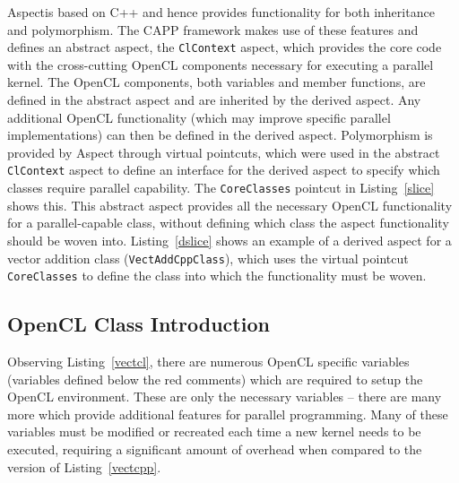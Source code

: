 \documentclass{sig-alternate-05-2015}
\begin{document}
Aspect\CPP is based on C++ and hence provides functionality for both inheritance
and polymorphism. The  CAPP framework makes use of these features and defines
an abstract aspect, the \lstinline$ClContext$ aspect, which provides the core \CPP code with 
the cross-cutting OpenCL components necessary for executing a parallel kernel.
The OpenCL  components, both variables and member functions, are defined in the abstract 
aspect and are inherited by the derived aspect. Any additional OpenCL
functionality (which may improve specific parallel implementations) can then be 
defined in the derived aspect. Polymorphism is provided by Aspect\CPP 
through virtual pointcuts, which were used in the abstract
\lstinline$ClContext$ aspect to define an interface for the derived aspect
to specify which \CPP classes require parallel capability.
The \lstinline$CoreClasses$ pointcut in Listing~\ref{slice} shows this.
This abstract aspect provides all the necessary OpenCL functionality for a 
parallel-capable class, without defining which \CPP class 
the aspect functionality should be woven into. Listing~\ref{dslice} shows an
example of a derived aspect for a \CPP vector addition class (\lstinline$VectAddCppClass$), 
which uses the virtual pointcut \lstinline$CoreClasses$ to define the \CPP class
into which the functionality must be woven.

\subsection{OpenCL Class Introduction}

Observing Listing~\ref{vectcl}, there are numerous OpenCL specific variables
(variables defined below the red comments) which are required to setup the 
OpenCL environment. These are only the necessary variables -- there are many
more which provide additional features for parallel programming.
Many of these variables must be modified or recreated each
time a new kernel needs to be executed, requiring a significant amount of 
overhead when compared to the \CPP version of Listing~\ref{vectcpp}.
\end{document}

